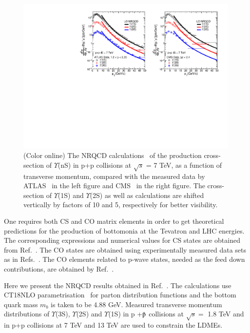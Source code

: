 \begin{figure}
  \centering
  \includegraphics[width=0.99\textwidth]{Figures/Fig4_CMS_ATLAS_YnS_7TeV_Pt.pdf}
  \caption{\small{(Color online) The NRQCD calculations~\cite{Kumar:2021sek} of the production cross-section of $\Upsilon$(nS) in
      p+p collisions at $\sqrt{s}$ = 7 TeV, as a function of transverse momentum, compared with
      the measured data by ATLAS~\cite{ATLAS:2012lmu} in the left figure and CMS~\cite{CMS:2013qur}
      in the right figure. The cross-section of $\Upsilon$(1S) and $\Upsilon$(2S) as well as
      calculations are shifted vertically by factors of 10 and 5, respectively for better visibility.}}
  \label{Fig:SigmaYnSCMS7TeV}
\end{figure}

One requires both CS and CO matrix elements in order to get theoretical
predictions for the production of bottomonia at the Tevatron and LHC energies.
The corresponding expressions and
numerical values for CS states are obtained from Ref.~\cite{Braaten:2000cm}.
The CO states are obtained using experimentally measured data sets 
as in Refs.~\cite{Braaten:2000cm,Cho:1995vh,Cho:1995ce}. 
The CO elements related to p-wave states, needed as the 
feed down contributions, are obtained by Ref.~\cite{Sharma:2012dy,Feng:2015wka}.

Here we present the NRQCD results obtained in Ref.~\cite{Kumar:2021sek}.
The calculations use CT18NLO parametrisation~\cite{Hou:2019efy} for parton distribution
functions and the bottom quark mass $m_b$ is taken to be 4.88 GeV.
Measured transverse momentum distributions of $\Upsilon$(3S), 
$\Upsilon$(2S) and $\Upsilon$(1S) in p +{$\bar {\rm p}$} collisions at
$\sqrt{s}=$ 1.8 TeV and in p+p collisions at 7 TeV and 13 TeV are used to constrain
the LDMEs.

